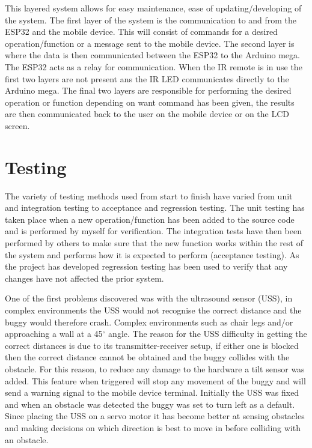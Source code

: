 \documentclass[8pt, a4paper]{article}
\begin{document}
This layered system allows for easy maintenance, ease of updating/developing of the system. The first layer of the system is the communication to and from the ESP32 and the mobile device. This will consist of commands for a desired operation/function or a message sent to the mobile device. The second layer is where the data is then communicated between the ESP32 to the Arduino mega. The ESP32 acts as a relay for communication. When the IR remote is in use the first two layers are not present ans the IR LED communicates directly to the Arduino mega. The final two layers are responsible for performing the desired operation or function depending on want command has been given, the results are then communicated back to the user on the mobile device or on the LCD screen.  

\section{Testing}

The variety of testing methods used from start to finish have varied from unit and integration testing to acceptance and regression testing. The unit testing has taken place when a new operation/function has been added to the source code and is performed by myself for verification. The integration tests have then been performed by others to make sure that the new function works within the rest of the system and performs how it is expected to perform (acceptance testing). As the project has developed regression testing has been used to verify that any changes have not affected the prior system.   

One of the first problems discovered was with the ultrasound sensor (USS), in complex environments the USS would not recognise the correct distance and the buggy would therefore crash. Complex environments such as chair legs and/or approaching a wall at a 45$^{\circ}$ angle. The reason for the USS difficulty in getting the correct distances is due to its transmitter-receiver setup, if either one is blocked then the correct distance cannot be obtained and the buggy collides with the obstacle. For this reason, to reduce any damage to the hardware a tilt sensor was added. This feature when triggered will stop any movement of the buggy and will send a warning signal to the mobile device terminal. Initially the USS was fixed and when an obstacle was detected the buggy was set to turn left as a default. Since placing the USS on a servo motor it has become better at sensing obstacles and making decisions on which direction is best to move in before colliding with an obstacle. 
\end{document}
